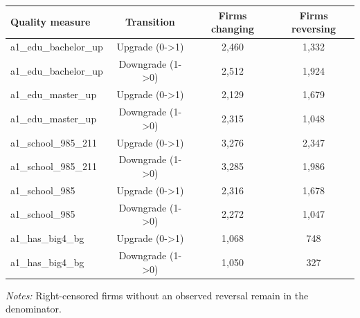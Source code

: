 \documentclass[10pt]{article}
\begin{document}
\begin{minipage}{19cm}\fontsize{10}{12}\selectfont\setlength{\tabcolsep}{4pt}\renewcommand{\arraystretch}{1.12}


\centering
{}
\begin{threeparttable}
\begin{tabular}{p{}ccc}
\toprule
Quality measure & Transition & Firms changing & Firms reversing \\
\midrule
a1\_edu\_bachelor\_up & Upgrade (0->1) & 2,460 & 1,332 \\
a1\_edu\_bachelor\_up & Downgrade (1->0) & 2,512 & 1,924 \\
a1\_edu\_master\_up & Upgrade (0->1) & 2,129 & 1,679 \\
a1\_edu\_master\_up & Downgrade (1->0) & 2,315 & 1,048 \\
a1\_school\_985\_211 & Upgrade (0->1) & 3,276 & 2,347 \\
a1\_school\_985\_211 & Downgrade (1->0) & 3,285 & 1,986 \\
a1\_school\_985 & Upgrade (0->1) & 2,316 & 1,678 \\
a1\_school\_985 & Downgrade (1->0) & 2,272 & 1,047 \\
a1\_has\_big4\_bg & Upgrade (0->1) & 1,068 & 748 \\
a1\_has\_big4\_bg & Downgrade (1->0) & 1,050 & 327 \\
\bottomrule
\end{tabular}
\begin{tablenotes}\fontsize{9}{11}\selectfont
\item \raggedright \fontsize{9}{11}\selectfont \textit{Notes:} Right-censored firms without an observed reversal remain in the denominator.
\end{tablenotes}
\end{threeparttable}

\end{minipage}
\end{document}
